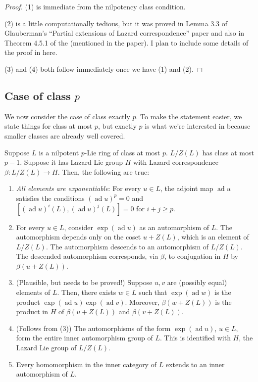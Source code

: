 \documentclass[10pt]{amsart}
\newcommand{\ad}{\operatorname{ad}}
\begin{document}
\begin{proof}
  (1) is immediate from the nilpotency class condition.

  (2) is a little computationally tedious, but it was proved in Lemma
  3.3 of Glauberman's ``Partial extensions of Lazard correspondence''
  paper and also in Theorem 4.5.1 of the (mentioned in the paper). I
  plan to include some details of the proof in here.

  (3) and (4) both follow immediately once we have (1) and (2).
\end{proof}


\subsection{Case of class $p$}

We now consider the case of class exactly $p$. To make the statement
easier, we state things for class at most $p$, but exactly $p$ is what
we're interested in because smaller classes are already well covered.

\begin{theorem}\label{class-p-innercategory}
  Suppose $L$ is a nilpotent $p$-Lie ring of class at most
  $p$. $L/Z(L)$ has class at most $p - 1$. Suppose it has Lazard Lie
  group $H$ with Lazard correspondence $\beta: L/Z(L) \to H$. Then,
  the following are true:

  \begin{enumerate}
  \item {\em All elements are exponentiable}: For every $u \in L$, the
    adjoint map $\ad u$ satisfies the conditions $(\ad u)^p = 0$ and
    $[(\ad u)^i(L),(\ad u)^j(L)] = 0$ for $i + j \ge p$.
  \item For every $u \in L$, consider $\exp(\ad u)$ as an automorphism
    of $L$. The automorphism depends only on the coset $u + Z(L)$,
    which is an element of $L/Z(L)$. The automorphism descends to an
    automorphism of $L/Z(L)$. The descended automorphism corresponds,
    via $\beta$, to conjugation in $H$ by $\beta(u + Z(L))$.
  \item (Plausible, but needs to be proved!) Suppose $u,v$ are
    (possibly equal) elements of $L$. Then, there exists $w \in L$
    such that $\exp(\ad w)$ is the product $\exp(\ad u) \exp(\ad
    v)$. Moreover, $\beta(w + Z(L))$ is the product in $H$ of $\beta(u
    + Z(L))$ and $\beta(v + Z(L))$.
  \item (Follows from (3)) The automorphisms of the form $\exp(\ad
    u)$, $u \in L$, form the entire inner automorphism group of
    $L$. This is identified with $H$, the Lazard Lie group of $L/Z(L)$.
  \item Every homomorphism in the inner category of $L$ extends to an
    inner automorphism of $L$.
  \end{enumerate}
\end{theorem}
\end{document}
